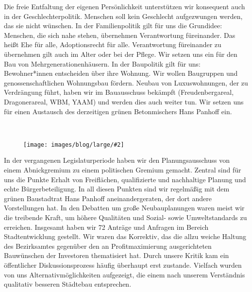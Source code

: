 \documentclass[a4paper,10pt]{article}
\newcommand{\mysection}[1]{{\vspace{1cm}\noindent\color{gray}{\ttfamily\LARGE\raggedright #1}\\\medskip}}
\newcommand{\abschnitt}[2]{%
\mysection{\raggedright #1}%
\begin{figure}[t]%
\vspace*{-2.7cm}%
\hspace*{-2.1cm}%
\texttt{[image: images/blog/large/\#2]} %
\end{figure}%
}
\newcommand{\bottomfigure}[1]{
\parbox{5cm}{
\vspace*{1cm}%
\texttt{[image: ./images/blog/large/\#1]}
}
}
\begin{document}
Die freie Entfaltung der eigenen Persönlichkeit unterstützen wir
konsequent auch in der Geschlechterpolitik. Menschen soll kein
Geschlecht aufgezwungen werden, das sie nicht wünschen. In der
Familienpolitik gilt für uns die Grundidee: Menschen, die sich nahe
stehen, übernehmen Verantwortung füreinander. Das heißt Ehe für alle,
Adoptionsrecht für alle. Verantwortung füreinander zu übernehmen gilt
auch im Alter oder bei der Pflege. Wir setzen uns ein für den Bau von
Mehrgenerationenhäusern. In der Baupolitik gilt für uns: Bewohner*innen
entscheiden über ihre Wohnung. Wir wollen Baugruppen und
genossenschaftlichen Wohnungsbau fördern. Neubau von Luxuswohnungen, der
zu Verdrängung führt, haben wir im Bauausschuss bekämpft
(Freudenbergareal, Dragonerareal, WBM, YAAM) und werden dies auch weiter
tun. Wir setzen uns für einen Austausch des derzeitigen grünen
Betonmischers Hans Panhoff ein.



\clearpage
\abschnitt{Stadtentwicklung}{Betonmischer.png}

In der vergangenen Legislaturperiode haben wir den Planungsausschuss von
einem Abnickgremium zu einem politischen Gremium gemacht. Zentral sind
für uns die Punkte Erhalt von Freiflächen, qualifizierte und nachhaltige
Planung und echte Bürgerbeteiligung. In all diesen Punkten sind wir
regelmäßig mit dem grünen Baustadtrat Hans Panhoff aneinandergeraten,
der dort andere Vorstellungen hat. In den Debatten um große
Neubauplanungen waren meist wir die treibende Kraft, um höhere
Qualitäten und Sozial- sowie Umweltstandards zu erreichen. Insgesamt
haben wir 72 Anträge und Anfragen im Bereich Stadtentwicklung gestellt.
Wir waren das Korrektiv, das die allzu weiche Haltung des Bezirksamtes
gegenüber den an Profitmaximierung ausgerichteten Bauwünschen der
Investoren thematisiert hat. Durch unsere Kritik kam ein öffentlicher
Diskussionsprozess häufig überhaupt erst zustande. Vielfach wurden von
uns Alternativmöglichkeiten aufgezeigt, die einem nach unserem
Verständnis qualitativ besseren Städtebau entsprechen.
\end{document}
